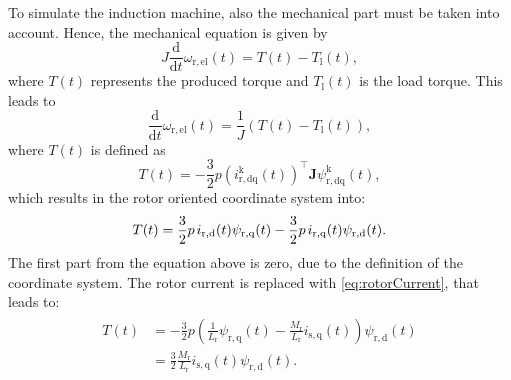\begin{solutionblock}
    To simulate the induction machine, also the mechanical part must be taken into account. Hence, the mechanical equation is given by
    \begin{equation}
        J \frac{\mathrm{d}}{\mathrm{d}t}\omega_{\mathrm{r,el}}(t) = T(t) - T_{\mathrm{l}}(t),
    \end{equation}
    where $T(t)$ represents the produced torque and $T_{\mathrm{l}}(t)$ is the load torque. This leads to
    \begin{equation}
        \frac{\mathrm{d}}{\mathrm{d}t}\omega_{\mathrm{r,el}}(t) = \frac{1}{J}\left(T(t)-T_{\mathrm{l}}(t)\right),
    \end{equation}
    where $T(t)$ is defined as
    \begin{equation}
        T(t) = -\frac{3}{2} p \left(i_{\mathrm{r,dq}}^{\mathrm{k}}(t)\right)^{\top} \bm{J} \psi_{\mathrm{r,dq}}^{\mathrm{k}}(t),
    \end{equation}
    which results in the rotor oriented coordinate system into:
    \begin{equation}
        T(t) = \frac{3}{2} p \hspace{0.5mm} i_{\mathrm{r,d}}(t)\psi_{\mathrm{r,q}}(t) - \frac{3}{2} p \hspace{0.5mm} i_{\mathrm{r,q}}(t)\psi_{\mathrm{r,d}}(t).
    \end{equation}
    The first part from the equation above is zero, due to the definition of the coordinate system. The rotor current is replaced with \eqref{eq:rotorCurrent}, that leads to:
    \begin{align}
        \begin{split}
            T(t) &= -\frac{3}{2} p \left(\frac{1}{L_{\mathrm{r}}} \psi_{\mathrm{r,q}}(t) - \frac{M_{\mathrm{r}}}{L_{\mathrm{r}}} i_{\mathrm{s,q}}(t) \right) \psi_{\mathrm{r,d}}(t) \\
            &= \frac{3}{2} \frac{M_{\mathrm{r}}}{L_{\mathrm{r}}} i_{\mathrm{s,q}}(t) \psi_{\mathrm{r,d}}(t).
        \end{split}
    \end{align}


\end{solutionblock}



